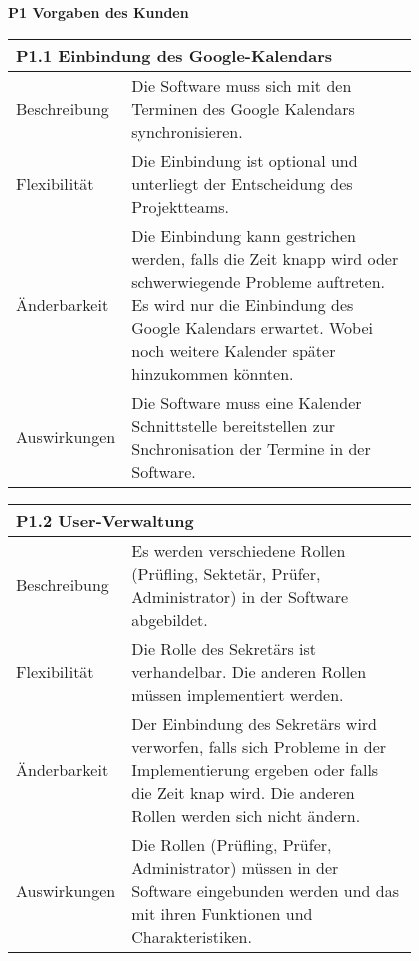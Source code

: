 {\textbf{P1 Vorgaben des Kunden} 

\centering
\begin{tabular}{|l|p{0.8\linewidth}|}
\hline
\multicolumn{2}{|l|}{\textbf{P1.1 Einbindung des Google-Kalendars}}
  \tabularnewline \hline
Beschreibung                                               &  Die Software muss sich mit den Terminen des Google Kalendars synchronisieren. \tabularnewline \hline
Flexibilität                                              & Die Einbindung ist optional und unterliegt der Entscheidung des Projektteams. \tabularnewline \hline
Änderbarkeit                                         & Die Einbindung kann gestrichen werden, falls die Zeit knapp wird oder schwerwiegende Probleme auftreten. Es wird nur die Einbindung des Google Kalendars erwartet. Wobei noch weitere Kalender später hinzukommen könnten.                                                               \tabularnewline \hline
Auswirkungen                                                & Die Software muss eine Kalender Schnittstelle bereitstellen zur Snchronisation der Termine in der Software. \tabularnewline \hline
 \hline
\end{tabular}


\centering
\begin{tabular}{|l|p{0.8\linewidth}|}
\hline
\multicolumn{2}{|l|}{\textbf{P1.2 User-Verwaltung}}
  \tabularnewline \hline
Beschreibung                                               &  Es werden verschiedene Rollen (Prüfling, Sektetär, Prüfer, Administrator) in der Software abgebildet. \tabularnewline \hline
Flexibilität                                              & Die Rolle des Sekretärs ist verhandelbar. Die anderen Rollen müssen implementiert werden.                                                                                \tabularnewline \hline
Änderbarkeit                                         & Der Einbindung des Sekretärs wird verworfen, falls sich Probleme in der Implementierung ergeben oder falls die Zeit knap wird. Die anderen Rollen werden sich nicht ändern.                                                                 \tabularnewline \hline
Auswirkungen                                                & Die Rollen (Prüfling, Prüfer, Administrator) müssen in der Software eingebunden werden und das mit ihren Funktionen und Charakteristiken.  \tabularnewline \hline
 \hline
\end{tabular}


}
